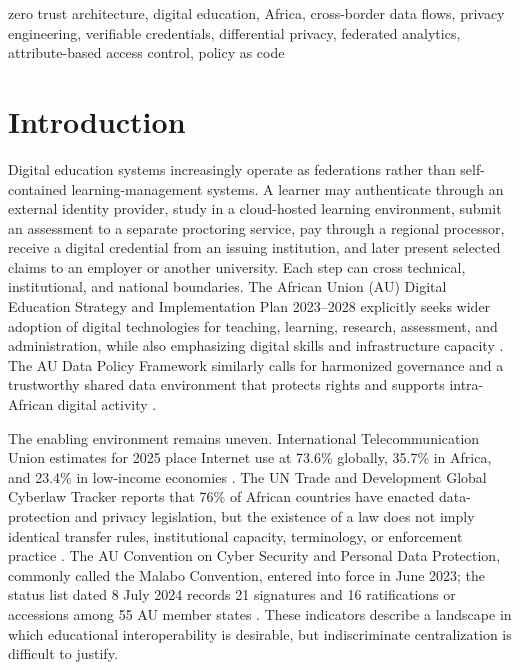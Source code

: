 \documentclass[journal]{IEEEtran}
\begin{document}
\begin{IEEEkeywords}
zero trust architecture, digital education, Africa, cross-border data flows, privacy engineering, verifiable credentials, differential privacy, federated analytics, attribute-based access control, policy as code
\end{IEEEkeywords}

\section{Introduction}
Digital education systems increasingly operate as federations rather than self-contained learning-management systems. A learner may authenticate through an external identity provider, study in a cloud-hosted learning environment, submit an assessment to a separate proctoring service, pay through a regional processor, receive a digital credential from an issuing institution, and later present selected claims to an employer or another university. Each step can cross technical, institutional, and national boundaries. The African Union (AU) Digital Education Strategy and Implementation Plan 2023--2028 explicitly seeks wider adoption of digital technologies for teaching, learning, research, assessment, and administration, while also emphasizing digital skills and infrastructure capacity \cite{audigitaleducation}. The AU Data Policy Framework similarly calls for harmonized governance and a trustworthy shared data environment that protects rights and supports intra-African digital activity \cite{audatapolicy}.

The enabling environment remains uneven. International Telecommunication Union estimates for 2025 place Internet use at 73.6\% globally, 35.7\% in Africa, and 23.4\% in low-income economies \cite{itu2025}. The UN Trade and Development Global Cyberlaw Tracker reports that 76\% of African countries have enacted data-protection and privacy legislation, but the existence of a law does not imply identical transfer rules, institutional capacity, terminology, or enforcement practice \cite{unctadtracker}. The AU Convention on Cyber Security and Personal Data Protection, commonly called the Malabo Convention, entered into force in June 2023; the status list dated 8 July 2024 records 21 signatures and 16 ratifications or accessions among 55 AU member states \cite{malaboconvention,malabostatus}. These indicators describe a landscape in which educational interoperability is desirable, but indiscriminate centralization is difficult to justify.
\end{document}
